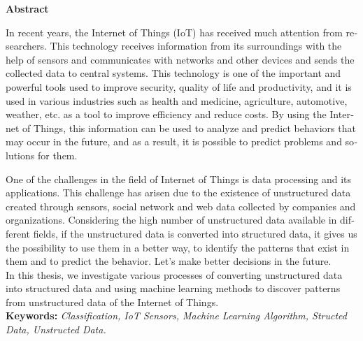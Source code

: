 %
%
%
%
\thispagestyle{empty} 	%
\begin{latin} 					%

\centerline{\textbf{\large{Abstract}}}
\vskip 1cm
\noindent 
In recent years, the Internet of Things (IoT) has received much attention from researchers. This technology receives information from its surroundings with the help of sensors and communicates with networks and other devices and sends the collected data to central systems. This technology is one of the important and powerful tools used to improve security, quality of life and productivity, and it is used in various industries such as health and medicine, agriculture, automotive, weather, etc. as a tool to improve efficiency and reduce costs. By using the Internet of Things, this information can be used to analyze and predict behaviors that may occur in the future, and as a result, it is possible to predict problems and solutions for them.

One of the challenges in the field of Internet of Things is data processing and its applications. This challenge has arisen due to the existence of unstructured data created through sensors, social network and web data collected by companies and organizations. Considering the high number of unstructured data available in different fields, if the unstructured data is converted into structured data, it gives us the possibility to use them in a better way, to identify the patterns that exist in them and to predict the behavior. Let's make better decisions in the future.
\\ In this thesis, we investigate various processes of converting unstructured data into structured data and using machine learning methods to discover patterns from unstructured data of the Internet of Things.\\

\noindent
\textbf{Keywords:} 
\emph{Classification, IoT Sensors, Machine Learning Algorithm, Structed Data, Unstructed Data.}
\end{latin}